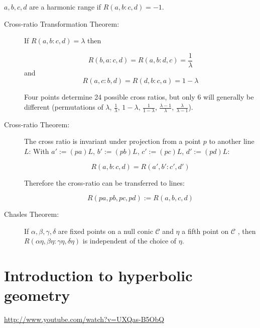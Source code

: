 \documentclass[DIV16,halfparskip]{scrartcl}
\newcommand{\nullcm}{\mathcal C}
\newcommand{\nullconic}{$\nullcm$ }
\begin{document}
$a, b, c, d$ are a harmonic range if $R(a,b:c,d) = -1$.

\begin{description}
    \item[Cross-ratio Transformation Theorem:] If $R(a,b:c,d) = \lambda$ then

        \[ R(b,a:c,d) = R(a,b:d,c) = \frac{1}{\lambda}\] and
        \[ R(a,c:b,d) = R(d,b:c,a) = 1-\lambda \]

    Four points determine 24 possible cross ratios, but only 6 will generally be
    different (permutations of $\lambda$, $\frac{1}{\lambda}$, $1-\lambda$,
    $\frac{1}{1-\lambda}$, $\frac{\lambda-1}{\lambda}$,
    $\frac{\lambda}{\lambda-1}$).

    \item[Cross-ratio Theorem:] The cross ratio is invariant under projection
        from a point $p$ to another line $L$: With $a':=(pa)L$, $b':=(pb)L$,
        $c':=(pc)L$, $d':=(pd)L$:

        \[ R(a,b:c,d) = R(a',b':c',d') \]

        Therefore the cross-ratio can be transferred to lines:

        \[ R(pa, pb, pc, pd) := R(a,b,c,d) \]

    \item [Chasles Theorem:] If $\alpha, \beta, \gamma, \delta$ are fixed
        points on a null conic \nullconic and $\eta$ a fifth point on
        \nullconic, then $R(\alpha\eta,\beta\eta:\gamma\eta,\delta\eta)$ is
        independent of the choice of $\eta$.

\end{description}

\clearpage
\section{Introduction to hyperbolic geometry}
\url{http://www.youtube.com/watch?v=UXQas-B5ObQ}
\end{document}
